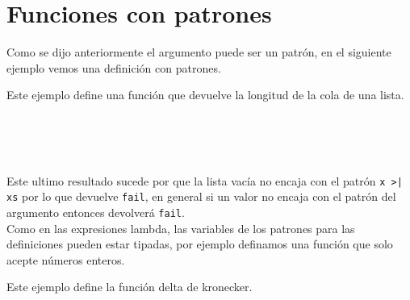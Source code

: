    \section{Funciones con patrones}
      Como se dijo anteriormente el argumento puede ser un patrón, en el siguiente ejemplo vemos una definición con patrones.
      
      \begin{fxcode}
      \end{fxcode}
      
      Este ejemplo define una función que devuelve la longitud de la cola de una lista.
      
      \begin{fxcode}
         \\
         \\
         \\
      \end{fxcode}
      
      Este ultimo resultado sucede por que la lista vacía no encaja con el patrón \texttt{x >| xs} por lo que devuelve \texttt{fail}, en general si un valor no encaja con el patrón del argumento entonces devolverá \texttt{fail}.
      \\
      
      Como en las expresiones lambda, las variables de los patrones para las definiciones pueden estar tipadas, por ejemplo definamos una función que solo acepte números enteros.
      
      \begin{fxcode}
      \end{fxcode}
      
      Este ejemplo define la función delta de kronecker.
      
      \begin{fxcode}
         \\
         \\
         \\
         \\
         \\
      \end{fxcode}
      
